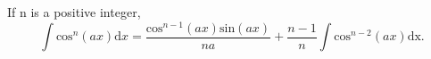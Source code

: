 If n is a positive integer,
\[ \int \mathrm{cos} ^{n}(ax)\mathrm{d}x
= \frac{\mathrm{cos}^{n-1} (ax)\mathrm{sin}(ax)}{na}
+ \frac{n-1}{n} \int \mathrm{cos}^{n-2}(ax)\mathrm{dx}
. \]